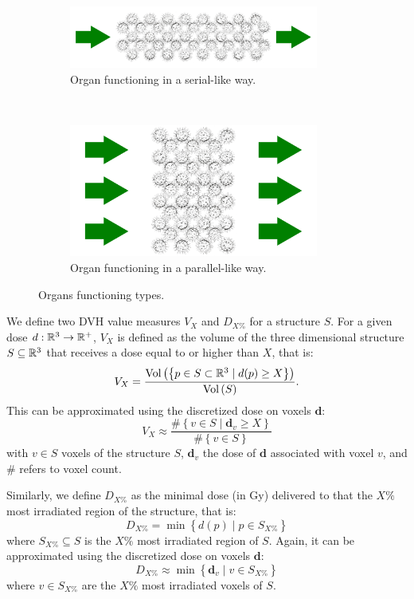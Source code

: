 \begin{figure}
	\begin{subfigure}{0.6\textwidth}
		\centering
		\includegraphics[width=0.9\textwidth]{serial_organ.pdf}
		\vspace{4mm}
		\caption{Organ functioning in a serial-like way.}
		\label{fig:serial_organ}
	\end{subfigure}
	\hfill
	\unskip\ \vrule\
	\hfill
	\begin{subfigure}{0.38\textwidth}
		\centering
		\includegraphics[width=0.9\textwidth]{parallel_organ.pdf}
		\caption{Organ functioning in a parallel-like way.}
		\label{fig:parallel_organ}
	\end{subfigure}
	\caption{Organs functioning types.}
	\label{fig:serial_parallel_organ}	
\end{figure}

We define two DVH value measures $V_X$ and $D_{X\%}$ for a structure $S$.
For a given dose $d: \mathbb{R}^3 \to \mathbb{R}^+$, $V_X$ is defined as the volume of the three dimensional structure $S \subseteq \mathbb{R}^3$ that receives a dose equal to or higher than $X$, that is:
$$ V_X = \frac{\text{Vol} \left( {\left\lbrace p \in S \subset \mathbb{R}^3 \mid d(p) \geq X \right\rbrace} \right)}{\text{Vol} \left( {S} \right)}.$$
This can be approximated using the discretized dose on voxels $\mathbf{d}$:
$$ V_X \approx \frac{ \#{\left\lbrace v \in S \mid \mathbf{d}_v \geq X \right\rbrace}}{\#\left\{ v \in S \right\}}$$
with $v \in S$ voxels of the structure $S$, $\mathbf{d}_v$ the dose of $\mathbf{d}$ associated with voxel $v$, and $\#$ refers to voxel count.

Similarly, we define $D_{X\%}$ as the minimal dose (in Gy) delivered to that the $X\%$ most irradiated region of the structure, that is:
$$D_{X\%} = \min \left\lbrace d(p) \mid p \in S_{X\%} \right\rbrace$$
where $S_{X\%} \subseteq S$ is the $X\%$ most irradiated region of $S$.
Again, it can be approximated using the discretized dose on voxels $\mathbf{d}$:
$$D_{X\%} \approx \min \left\lbrace \mathbf{d}_v \mid v \in S_{X\%} \right\rbrace$$
where $v \in S_{X\%}$ are the $X\%$ most irradiated voxels of $S$.

